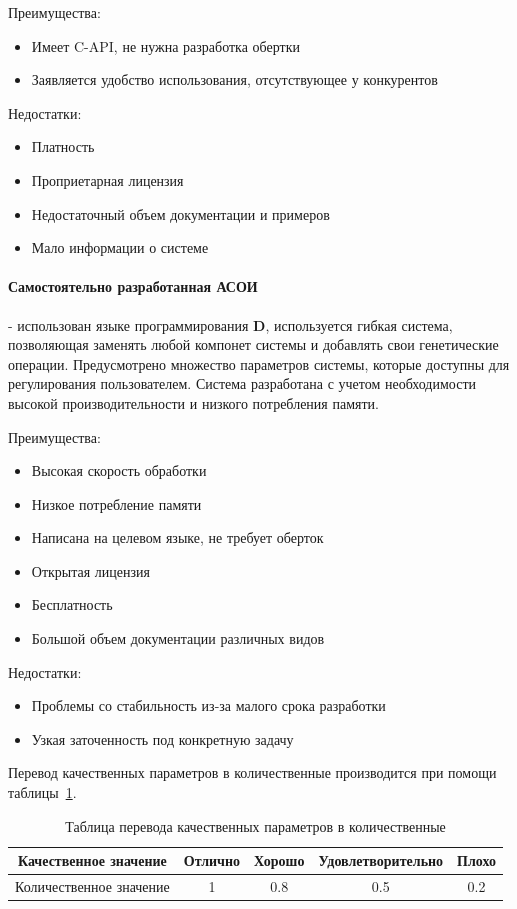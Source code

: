 \documentclass[russian,utf8,emptystyle]{eskdtext}
\begin{document}
\begin{spacing}{1.5}
Преимущества:
\begin{itemize}
\item Имеет C-API, не нужна разработка обертки
\item Заявляется удобство использования, отсутствующее у конкурентов
\end{itemize}

Недостатки:
\begin{itemize}
\item Платность
\item Проприетарная лицензия
\item Недостаточный объем документации и примеров
\item Мало информации о системе
\end{itemize}

\paragraph{Самостоятельно разработанная АСОИ} - использован языке программирования \textbf{D}, используется гибкая система, позволяющая заменять любой компонет системы и добавлять свои генетические операции. Предусмотрено множество параметров системы, которые доступны для регулирования пользователем. Система разработана с учетом необходимости высокой производительности и низкого потребления памяти.

Преимущества:
\begin{itemize}
\item Высокая скорость обработки
\item Низкое потребление памяти
\item Написана на целевом языке, не требует оберток
\item Открытая лицензия
\item Бесплатность
\item Большой объем документации различных видов
\end{itemize}

Недостатки:
\begin{itemize}
\item Проблемы со стабильность из-за малого срока разработки
\item Узкая заточенность под конкретную задачу
\end{itemize}

Перевод качественных параметров в количественные производится при помощи таблицы~\ref{tab:quality_to_value}.
\begin{table}
\centering
\caption{Таблица перевода качественных параметров в количественные}
\label{tab:quality_to_value}
\begin{tabular}{|c|c|c|c|c|}
\hline 
Качественное значение & Отлично & Хорошо & Удовлетворительно & Плохо \\ 
\hline 
Количественное значение & 1 & 0.8 & 0.5 & 0.2 \\ 
\hline 
\end{tabular} 
\end{table}


\end{spacing}
\end{document}
